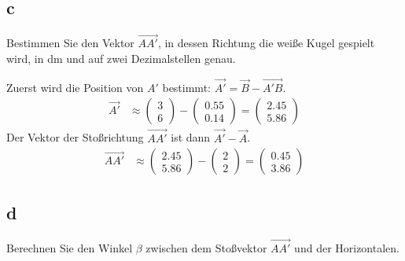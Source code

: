 \subsection{c}

Bestimmen Sie den Vektor \(\vec{AA'}\), in dessen Richtung die weiße Kugel gespielt wird, in dm und auf zwei Dezimalstellen genau.

Zuerst wird die Position von \(A'\) bestimmt: \(\vec{A'} = \vec{B} - \vec{A'B}\).
\begin{align*}
    \vec{A'} &\approx \begin{pmatrix} 3 \\ 6 \end{pmatrix} - \begin{pmatrix} 0.55 \\ 0.14 \end{pmatrix} = \begin{pmatrix} 2.45 \\ 5.86 \end{pmatrix}
\end{align*}
Der Vektor der Stoßrichtung \(\vec{AA'}\) ist dann \(\vec{A'} - \vec{A}\).
\begin{align*}
    \vec{AA'} &\approx \begin{pmatrix} 2.45 \\ 5.86 \end{pmatrix} - \begin{pmatrix} 2 \\ 2 \end{pmatrix} = \begin{pmatrix} 0.45 \\ 3.86 \end{pmatrix}
\end{align*}

\subsection{d}
Berechnen Sie den Winkel \(\beta\) zwischen dem Stoßvektor \(\vec{AA'}\) und der Horizontalen.

